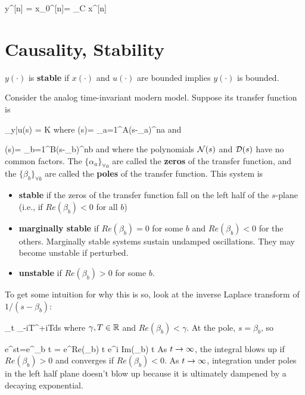 \beq
y^{[n]} = x_0^{[n]}=
_{C}
x^{[n]}
\eeq



\section{Causality, Stability}

$y(\cdot)$ is {\bf stable}
if $x(\cdot)$ 
and $u(\cdot)$ are bounded implies
$y(\cdot)$ is bounded.

Consider the analog time-invariant modern model.
Suppose its transfer function is

\beq
{}_{y|u}(s)
= K
\eeq
where
\beq
\caln(s)= \prod_{a=1}^{A}(s-\alpha_a)^{na}
\eeq
and

\beq
\cald(s)= \prod_{b=1}^{B}(s-\beta_b)^{nb}
\eeq
and where 
the polynomials ${\cal N}(s)$ and ${\cal D}(s)$
have no common factors. The $\{\alpha_a\}_{\forall a}$ are
called the {\bf zeros}
of the transfer function,
and the $\{\beta_b\}_{\forall b}$ are called the
{\bf poles} of the transfer function.
This system
is 
\begin{itemize}
\item
{\bf stable} if the zeros of the
transfer function fall on the
left half of the $s$-plane (i.e., 
if $Re(\beta_b)<0$ for all $b$)

\item
{\bf marginally stable} if
$Re(\beta_b)=0$ for some $b$
and $Re(\beta_b)<0$
for the others.
Marginally stable systems
sustain undamped oscillations.
They may become unstable
if perturbed.

\item {\bf unstable}
if $Re(\beta_b)> 0$ for some $b$.
\end{itemize}

To get some intuition for why this is so,
look at the inverse Laplace transform 
of $1/(s-\beta_b)$:

\beq
\lim_{t\rarrow \infty}
\int_{\gamma-iT}^{\gamma+iT}ds\;
\eeq
where $\gamma, T\in{ \mathbb{R}}$
and $Re(\beta_b)< \gamma$.
At the pole, $s=\beta_b$, so


\beq
e^{st}=e^{\beta_b t} = e^{Re(\beta_b) t} 
e^{i Im(\beta_b) t}
\eeq
As $t\rightarrow \infty$, 
the integral blows up 
if $Re(\beta_b)>0$ and
converges if $Re(\beta_b)<0$.
As $t\rightarrow \infty$, 
integration under poles in
the left half plane
doesn't
blow up
because it is ultimately
dampened by a decaying
exponential.

